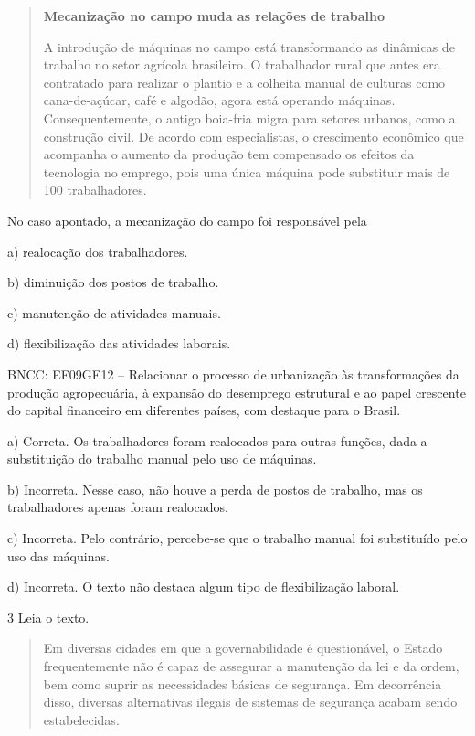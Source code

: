 \begin{quote}
\textbf{Mecanização no campo muda as relações de trabalho}

A introdução de máquinas no campo está transformando as dinâmicas de trabalho no setor agrícola brasileiro. O trabalhador rural que antes era contratado para realizar o plantio e a colheita manual de culturas como cana-de-açúcar, café e algodão, agora está operando máquinas. Consequentemente, o antigo boia-fria migra para setores urbanos, como a construção civil. De acordo com especialistas, o crescimento econômico que acompanha o aumento da produção tem compensado os efeitos da tecnologia no emprego, pois uma única máquina pode substituir mais de 100 trabalhadores.

\end{quote}

No caso apontado, a mecanização do campo foi responsável pela

a)  realocação dos trabalhadores.

b)  diminuição dos postos de trabalho.

c)  manutenção de atividades manuais.

d)  flexibilização das atividades laborais.

BNCC: EF09GE12 -- Relacionar o processo de urbanização às transformações
da produção agropecuária, à expansão do desemprego estrutural e ao papel
crescente do capital financeiro em diferentes países, com destaque para
o Brasil.

a) Correta. Os trabalhadores foram realocados para outras
funções, dada a substituição do trabalho manual pelo uso de máquinas.

b) Incorreta. Nesse caso, não houve a perda de postos de trabalho, mas os
trabalhadores apenas foram realocados.

c) Incorreta. Pelo contrário, percebe-se que o trabalho manual foi
substituído pelo uso das máquinas.

d) Incorreta. O texto não destaca algum tipo de flexibilização
laboral.


\num{3} Leia o texto.

\begin{quote}
Em diversas cidades em que a governabilidade é questionável, o Estado frequentemente não é capaz de assegurar a manutenção da lei e da ordem, bem como suprir as necessidades básicas de segurança. Em decorrência disso, diversas alternativas ilegais de sistemas de segurança acabam sendo estabelecidas.

\end{quote}

